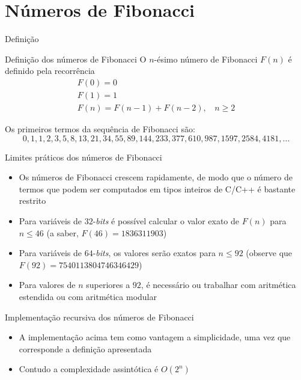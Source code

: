 \section{Números de Fibonacci}

\begin{frame}[fragile]{Definição}

    \begin{block}{Definição dos números de Fibonacci}
        O $n$-ésimo número de Fibonacci $F(n)$ é definido pela recorrência
$$
\begin{array}{l}
        F(0) = 0\\
        F(1) = 1\\
        F(n) = F(n - 1) + F(n - 2),\ \ \ \ n \geq 2
\end{array}
$$
    \end{block}

    \vspace{0.1in}

    Os primeiros termos da sequência de Fibonacci são:
$$
    0, 1, 1, 2, 3, 5, 8, 13, 21, 34, 55, 89, 144, 233, 377, 610, 987, 1597, 2584, 4181, \ldots
$$
\end{frame}

\begin{frame}[fragile]{Limites práticos dos números de Fibonacci}

    \begin{itemize}
        \item Os números de Fibonacci crescem rapidamente, de modo que o número de termos que podem 
            ser computados em tipos inteiros de C/C++ é bastante restrito

        \item Para variáveis de $32$-\textit{bits} é possível calcular o valor exato de $F(n)$ para 
            $n\leq 46$ (a saber, $F(46) = 1836311903$)

        \item Para variáveis de $64$-\textit{bits}, os valores serão exatos para $n\leq 92$ 
            (observe que $F(92) = 7540113804746346429$)

        \item Para valores de $n$ superiores a $92$, é necessário ou trabalhar com aritmética 
            estendida ou com aritmética modular
    \end{itemize}

\end{frame}

\begin{frame}[fragile]{Implementação recursiva dos números de Fibonacci}

    \begin{itemize}

        \item A implementação acima tem como vantagem a simplicidade, uma vez que corresponde a
            definição apresentada

        \item Contudo a complexidade assintótica é $O(2^n)$
    \end{itemize}

\end{frame}

